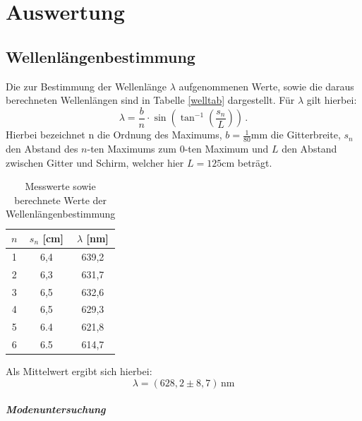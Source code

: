 \section{Auswertung}
\subsection{Wellenlängenbestimmung}
Die zur Bestimmung der Wellenlänge $\lambda$ aufgenommenen Werte, sowie die daraus berechneten Wellenlängen sind in Tabelle \ref{welltab} dargestellt. Für $\lambda$ gilt hierbei:
\begin{equation}
  \lambda = \frac{b}{n}\cdot\sin\left(\tan^{-1}\left(\frac{s_n}{L}\right)\right) \, .
\end{equation}
Hierbei bezeichnet n die Ordnung des Maximums, $b=\frac{1}{80}\si{\milli\meter}$ die Gitterbreite, $s_n$ den Abstand des $n$-ten Maximums zum $0$-ten Maximum und $L$ den Abstand zwischen Gitter und Schirm,
welcher hier $L=125 \si{\centi\meter}$ beträgt.
\begin{table}[H]
  \centering
\begin{tabular}{c|c|c}
$n$  & $s_n$ [cm]    & $\lambda$ [nm]     \\
\hline
1 & 6,4 & 639,2 \\
2 & 6,3 & 631,7 \\
3 & 6,5 & 632,6 \\
4 & 6,5 & 629,3 \\
5 & 6.4 & 621,8 \\
6 & 6.5 & 614,7
\end{tabular}
\caption{Messwerte sowie berechnete Werte der Wellenlängenbestimmung}
\end{table}
Als Mittelwert ergibt sich hierbei:
\begin{equation}
  \lambda= (628,2 \pm 8,7) \, \si{\nano\meter}
\end{equation}
\subparagraph{Modenuntersuchung}
